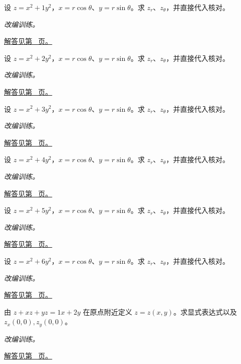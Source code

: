 \documentclass[12pt,fontset=fandol]{ctexart}
\begin{document}
\begin{example}[极坐标下的链式法则]\label{ex:c33q7}
设 $z=x^2+1y^2$，$x=r\cos\theta$、$y=r\sin\theta$。求 $z_r$、$z_\theta$，并直接代入核对。
\par\textit{改编训练。}\par\hyperref[ans:c33q7]{解答见第~\pageref{ans:c33q7} 页。}
\end{example}
\begin{example}[极坐标下的链式法则]\label{ex:c33q8}
设 $z=x^2+2y^2$，$x=r\cos\theta$、$y=r\sin\theta$。求 $z_r$、$z_\theta$，并直接代入核对。
\par\textit{改编训练。}\par\hyperref[ans:c33q8]{解答见第~\pageref{ans:c33q8} 页。}
\end{example}
\begin{example}[极坐标下的链式法则]\label{ex:c33q9}
设 $z=x^2+3y^2$，$x=r\cos\theta$、$y=r\sin\theta$。求 $z_r$、$z_\theta$，并直接代入核对。
\par\textit{改编训练。}\par\hyperref[ans:c33q9]{解答见第~\pageref{ans:c33q9} 页。}
\end{example}
\begin{example}[极坐标下的链式法则]\label{ex:c33q10}
设 $z=x^2+4y^2$，$x=r\cos\theta$、$y=r\sin\theta$。求 $z_r$、$z_\theta$，并直接代入核对。
\par\textit{改编训练。}\par\hyperref[ans:c33q10]{解答见第~\pageref{ans:c33q10} 页。}
\end{example}
\begin{example}[极坐标下的链式法则]\label{ex:c33q11}
设 $z=x^2+5y^2$，$x=r\cos\theta$、$y=r\sin\theta$。求 $z_r$、$z_\theta$，并直接代入核对。
\par\textit{改编训练。}\par\hyperref[ans:c33q11]{解答见第~\pageref{ans:c33q11} 页。}
\end{example}
\begin{example}[极坐标下的链式法则]\label{ex:c33q12}
设 $z=x^2+6y^2$，$x=r\cos\theta$、$y=r\sin\theta$。求 $z_r$、$z_\theta$，并直接代入核对。
\par\textit{改编训练。}\par\hyperref[ans:c33q12]{解答见第~\pageref{ans:c33q12} 页。}
\end{example}
\begin{example}[隐函数的一阶偏导]\label{ex:c33q13}
由 $z+xz+yz=1x+2y$ 在原点附近定义 $z=z(x,y)$。求显式表达式以及 $z_x(0,0),z_y(0,0)$。
\par\textit{改编训练。}\par\hyperref[ans:c33q13]{解答见第~\pageref{ans:c33q13} 页。}
\end{example}
\end{document}
